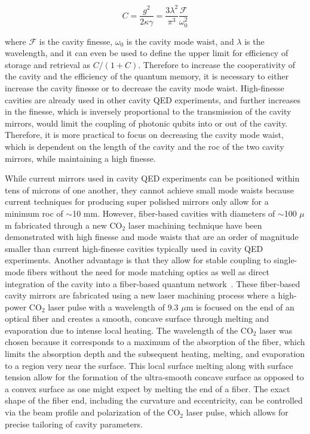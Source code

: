 \documentclass[a4paper]{article}
\begin{document}
\begin{equation}
C = \frac{g ^2}{2 \kappa\gamma } = \frac{3\lambda^2}{\pi^3}\frac{\mathcal{F}}{\omega_0^2}
\end{equation}

\noindent where $\mathcal{F}$ is the cavity finesse, $\omega_0$ is the cavity mode waist, and $\lambda$ is the wavelength, and it can even be used to define the upper limit for efficiency of storage and retrieval as $C/(1+C)$. Therefore to increase the cooperativity of the cavity and the efficiency of the quantum memory, it is necessary to either increase the cavity finesse or to decrease the cavity mode waist. High-finesse cavities are already used in other cavity QED experiments, and further increases in the finesse, which is inversely proportional to the transmission of the cavity mirrors, would limit the coupling of photonic qubits into or out of the cavity.  Therefore, it is more practical to focus on decreasing the cavity mode waist, which is dependent on the length of the cavity and the \gls{roc} of the two cavity mirrors, while maintaining a high finesse. 

While current mirrors used in cavity QED experiments can be positioned within tens of microns of one another, they cannot achieve small mode waists because current techniques for producing super polished mirrors only allow for a minimum \gls{roc} of $\sim$10 mm. However, fiber-based cavities with diameters of $\sim$100 $\mu$m fabricated through a new CO$_2$ laser machining technique have been demonstrated with high finesse and mode waists that are an order of magnitude smaller than current high-finesse cavities typically used in cavity QED experiments. Another advantage is that they allow for stable coupling to single-mode fibers without the need for mode matching optics as well as direct integration of the cavity into a fiber-based quantum network~\cite{Uphoff2015a,Hunger2010}. These fiber-based cavity mirrors are fabricated using a new laser machining process where a high-power CO$_2$ laser pulse with a wavelength of 9.3 $\mu$m is focused on the end of an optical fiber and creates a smooth, concave surface through melting and evaporation due to intense local heating. The wavelength of the CO$_2$ laser was chosen because it corresponds to a maximum of the absorption of the fiber, which limits the absorption depth and the subsequent heating, melting, and evaporation to a region very near the surface. This local surface melting along with surface tension allow for the formation of the ultra-smooth concave surface as opposed to a convex surface as one might expect by melting the end of a fiber. The exact shape of the fiber end, including the curvature and eccentricity, can be controlled via the beam profile and polarization of the CO$_2$ laser pulse, which allows for precise tailoring of cavity parameters.
\end{document}

